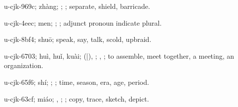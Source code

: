 \begin{multicols}{2}
{\cjkgGlue{}u-cjk-969c; zhàng; \cjkgGlue{}\cjkgGlue{}\cjkgGlue{}; \cjkgGlue{}; separate, shield, barricade.

\cjkgGlue{}u-cjk-4eec; men; \cjkgGlue{}; \cjkgGlue{}; adjunct pronoun indicate plural.

\cjkgGlue{}u-cjk-8bf4; shuō; speak, say, talk, scold, upbraid.

\cjkgGlue{}u-cjk-6703; huì, huǐ, kuài; \cjkgGlue{}\cjkgGlue{}(\cjkgGlue{}|\cjkgGlue{}), \cjkgGlue{}\cjkgGlue{}\cjkgGlue{}; \cjkgGlue{}, \cjkgGlue{}; to assemble, meet together, a meeting, an organization.

\cjkgGlue{}u-cjk-65f6; shí; \cjkgGlue{}; \cjkgGlue{}; time, season, era, age, period.

\cjkgGlue{}u-cjk-63cf; miáo; \cjkgGlue{}\cjkgGlue{}\cjkgGlue{}, \cjkgGlue{}\cjkgGlue{}\cjkgGlue{}; \cjkgGlue{}; copy, trace, sketch, depict.

}
\end{multicols}
